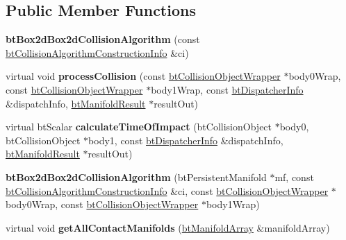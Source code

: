 \subsection*{Public Member Functions}
\begin{DoxyCompactItemize}
\item 
\hypertarget{classbt_box2d_box2d_collision_algorithm_ada986fe8e7553712794c54b4fe1083b7}{{\bfseries bt\+Box2d\+Box2d\+Collision\+Algorithm} (const \hyperlink{structbt_collision_algorithm_construction_info}{bt\+Collision\+Algorithm\+Construction\+Info} \&ci)}\label{classbt_box2d_box2d_collision_algorithm_ada986fe8e7553712794c54b4fe1083b7}

\item 
\hypertarget{classbt_box2d_box2d_collision_algorithm_a3846aea21893fc6bae2c122b5ae8c862}{virtual void {\bfseries process\+Collision} (const \hyperlink{structbt_collision_object_wrapper}{bt\+Collision\+Object\+Wrapper} $\ast$body0\+Wrap, const \hyperlink{structbt_collision_object_wrapper}{bt\+Collision\+Object\+Wrapper} $\ast$body1\+Wrap, const \hyperlink{structbt_dispatcher_info}{bt\+Dispatcher\+Info} \&dispatch\+Info, \hyperlink{classbt_manifold_result}{bt\+Manifold\+Result} $\ast$result\+Out)}\label{classbt_box2d_box2d_collision_algorithm_a3846aea21893fc6bae2c122b5ae8c862}

\item 
\hypertarget{classbt_box2d_box2d_collision_algorithm_accb9ce1c6603be1f06d52cc990a59fd3}{virtual bt\+Scalar {\bfseries calculate\+Time\+Of\+Impact} (bt\+Collision\+Object $\ast$body0, bt\+Collision\+Object $\ast$body1, const \hyperlink{structbt_dispatcher_info}{bt\+Dispatcher\+Info} \&dispatch\+Info, \hyperlink{classbt_manifold_result}{bt\+Manifold\+Result} $\ast$result\+Out)}\label{classbt_box2d_box2d_collision_algorithm_accb9ce1c6603be1f06d52cc990a59fd3}

\item 
\hypertarget{classbt_box2d_box2d_collision_algorithm_accd5db2c4a57139e641ad36c1df4d9d8}{{\bfseries bt\+Box2d\+Box2d\+Collision\+Algorithm} (bt\+Persistent\+Manifold $\ast$mf, const \hyperlink{structbt_collision_algorithm_construction_info}{bt\+Collision\+Algorithm\+Construction\+Info} \&ci, const \hyperlink{structbt_collision_object_wrapper}{bt\+Collision\+Object\+Wrapper} $\ast$body0\+Wrap, const \hyperlink{structbt_collision_object_wrapper}{bt\+Collision\+Object\+Wrapper} $\ast$body1\+Wrap)}\label{classbt_box2d_box2d_collision_algorithm_accd5db2c4a57139e641ad36c1df4d9d8}

\item 
\hypertarget{classbt_box2d_box2d_collision_algorithm_a2cd6900f9965d1d9a9dde43037fe0631}{virtual void {\bfseries get\+All\+Contact\+Manifolds} (\hyperlink{classbt_aligned_object_array}{bt\+Manifold\+Array} \&manifold\+Array)}\label{classbt_box2d_box2d_collision_algorithm_a2cd6900f9965d1d9a9dde43037fe0631}

\end{DoxyCompactItemize}
